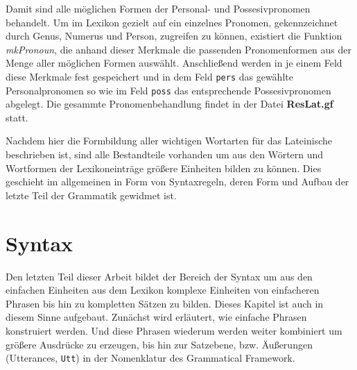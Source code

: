 \documentclass[12pt,abstract=on,titlepage,bibliography=totoc,ngerman,listof=totoc]{scrreprt}
\begin{document}
Damit sind alle möglichen Formen der Personal- und Possesivpronomen behandelt. Um im Lexikon gezielt auf ein einzelnes Pronomen, gekennzeichnet durch Genus, Numerus und Person, zugreifen zu können, existiert die Funktion \textit{mkPronoun}, die anhand dieser Merkmale die passenden Pronomenformen aus der Menge aller möglichen Formen auswählt. Anschließend werden in je einem Feld diese Merkmale fest gespeichert und in dem Feld \texttt{pers} das gewählte Personalpronomen so wie im Feld \texttt{poss} das entsprechende Possesivpronomen abgelegt. Die gesammte Pronomenbehandlung findet in der Datei \textbf{ResLat.gf} statt. \par
Nachdem hier die Formbildung aller wichtigen Wortarten für das Lateinische beschrieben ist, sind alle Bestandteile vorhanden um aus den Wörtern und Wortformen der Lexikoneinträge größere Einheiten bilden zu können. Dies geschieht im allgemeinen in Form von Syntaxregeln, deren Form und Aufbau der letzte Teil der Grammatik gewidmet ist.
\pagebreak
\section{Syntax}
\label{sec:syntax}
Den letzten Teil dieser Arbeit bildet der Bereich der Syntax um aus den einfachen Einheiten aus dem Lexikon komplexe Einheiten von einfacheren Phrasen bis hin zu kompletten Sätzen zu bilden. Dieses Kapitel ist auch in diesem Sinne aufgebaut. Zunächst wird erläutert, wie einfache Phrasen konstruiert werden. Und diese Phrasen wiederum werden weiter kombiniert um größere Ausdrücke zu erzeugen, bis hin zur Satzebene, bzw. Äußerungen (Utterances, \texttt{Utt}) in der Nomenklatur des Grammatical Framework.
\end{document}
